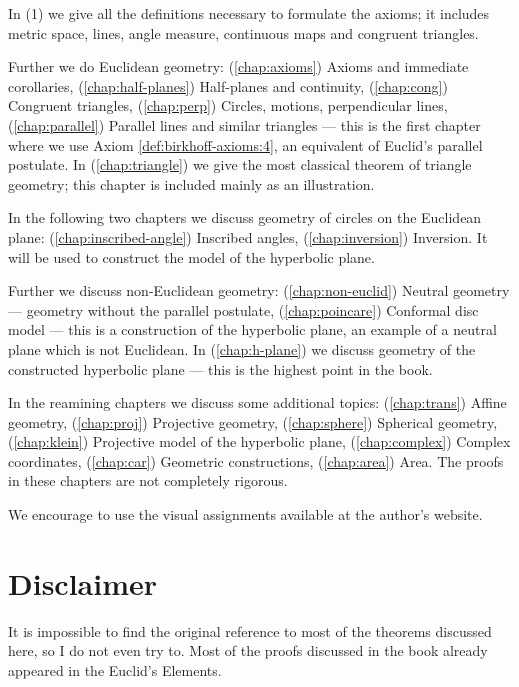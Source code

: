 \smallskip

In (1) we give all the definitions necessary to formulate the axioms;
it includes metric space, 
lines, 
angle measure, 
continuous maps and congruent triangles.


Further we do Euclidean geometry:
(\ref{chap:axioms}) Axioms and immediate corollaries,
(\ref{chap:half-planes}) Half-planes and continuity,
(\ref{chap:cong}) Congruent triangles,
(\ref{chap:perp}) Circles, motions, perpendicular lines,
(\ref{chap:parallel}) Parallel lines and similar triangles
--- this is the first chapter where we use Axiom \ref{def:birkhoff-axioms:4}, an equivalent of Euclid's parallel postulate.
In (\ref{chap:triangle}) we give the most classical theorem of triangle geometry;
this chapter is included mainly as an illustration.


In the following two chapters we discuss geometry of circles on the Euclidean plane:
(\ref{chap:inscribed-angle}) Inscribed angles, (\ref{chap:inversion}) Inversion.
It  will be used to construct the model of the hyperbolic plane.

Further 
we discuss non-Euclidean geometry:
(\ref{chap:non-euclid})
Neutral geometry --- geometry without the parallel postulate,
(\ref{chap:poincare})
Conformal disc model ---
this is a construction of the hyperbolic plane,
an example of a neutral plane which is not Euclidean.
In (\ref{chap:h-plane}) we discuss geometry of the constructed hyperbolic plane --- this is the highest point in the book.

In the reamining chapters we discuss some additional topics:
(\ref{chap:trans}) Affine geometry,
(\ref{chap:proj}) Projective geometry,
(\ref{chap:sphere}) Spherical geometry, 
(\ref{chap:klein}) Projective model of the hyperbolic plane,
(\ref{chap:complex}) Complex coordinates,
(\ref{chap:car}) Geometric constructions,
(\ref{chap:area}) Area.
The proofs in these chapters are not completely rigorous.

We encourage to use the visual assignments available at the author's website.

\section*{Disclaimer}

It is  impossible to find the original reference to most of the theorems discussed here, so I do not even try to.
Most of the proofs discussed in the book 
already appeared in the Euclid's Elements.

